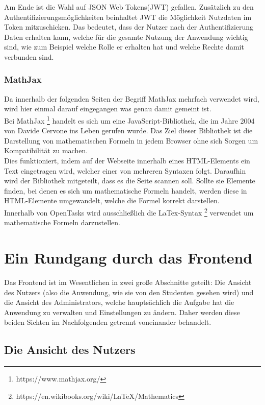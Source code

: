 Am Ende ist die Wahl auf JSON Web Tokens(JWT) gefallen. Zusätzlich zu den Authentifizierungsmöglichkeiten beinhaltet JWT die Möglichkeit Nutzdaten im Token mitzuschicken. Das bedeutet, dass der Nutzer nach der Authentifizierung Daten erhalten kann, welche für die gesamte Nutzung der Anwendung wichtig sind, wie zum Beispiel welche Rolle er erhalten hat und welche Rechte damit verbunden sind. 

\subsection{MathJax}

Da innerhalb der folgenden Seiten der Begriff MathJax mehrfach verwendet wird, wird hier einmal darauf eingegangen was genau damit gemeint ist. \\

Bei MathJax \footnote{https://www.mathjax.org/} handelt es sich um eine JavaScript-Bibliothek, die im Jahre 2004 von Davide Cervone ins Leben gerufen wurde. Das Ziel dieser Bibliothek ist die Darstellung von mathematischen Formeln in jedem Browser ohne sich Sorgen um Kompatibilität zu machen. \\
Dies funktioniert, indem auf der Webseite innerhalb eines HTML-Elements ein Text eingetragen wird, welcher einer von mehreren Syntaxen folgt. Daraufhin wird der Bibliothek mitgeteilt, dass es die Seite scannen soll. Sollte sie Elemente finden, bei denen es sich um mathematische Formeln handelt, werden diese in HTML-Elemente umgewandelt, welche die Formel korrekt darstellen. \\

Innerhalb von OpenTasks wird ausschließlich die LaTex-Syntax \footnote{https://en.wikibooks.org/wiki/LaTeX/Mathematics} verwendet um mathematische Formeln darzustellen.

\chapter{Ein Rundgang durch das Frontend}

Das Frontend ist im Wesentlichen in zwei große Abschnitte geteilt: Die Ansicht des Nutzers (also die Anwendung, wie sie von den Studenten gesehen wird) und die Ansicht des Administrators, welche hauptsächlich die Aufgabe hat die Anwendung zu verwalten und Einstellungen zu ändern. Daher werden diese beiden Sichten im Nachfolgenden getrennt voneinander behandelt.

\section{Die Ansicht des Nutzers}

